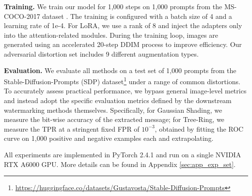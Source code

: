 \documentclass{article}
\begin{document}
\textbf{Training.}
We train our model for 1,000 steps on 1,000 prompts from the MS-COCO-2017 dataset \citep{coco_2014}. The training is configured with a batch size of 4 and a learning rate of 1e-4. For LoRA, we use a rank of 8 and inject the adapters only into the attention-related modules. During the training loop, images are generated using an accelerated 20-step DDIM process to improve efficiency.
Our adversarial distortion set includes 9 different augmentation types.

\textbf{Evaluation.} %
We evaluate all methods on a test set of 1,000 prompts from the Stable-Diffusion-Prompts (SDP) dataset\footnote{\url{https://huggingface.co/datasets/Gustavosta/Stable-Diffusion-Prompts}} under a range of common distortions. To accurately assess practical performance, we bypass general image-level metrics and instead adopt the specific evaluation metrics defined by the downstream watermarking methods themselves. Specifically,
for Gaussian Shading, we measure the bit-wise accuracy of the extracted message;
for Tree-Ring, we measure the TPR at a stringent fixed FPR of $10^{-3}$, obtained by fitting the ROC curve on 1,000 positive and negative examples each and extrapolating.

All experiments are implemented in PyTorch 2.4.1 and run on a single NVIDIA RTX A6000 GPU. More details can be found in Appendix \ref{sec:app_exp_set}.
\end{document}
